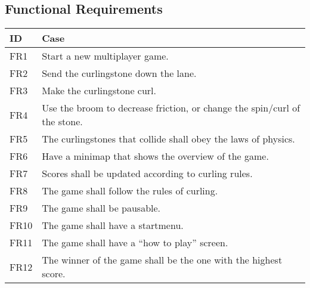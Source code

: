 \subsection{Functional Requirements}

\begin{center}
    \begin{tabular}{ | l | p{12cm} |}
    \hline
	\textbf{ID} & \textbf{Case} \\ \hline
	FR1 & Start a new multiplayer game.\\ \hline 
	FR2 & Send the curlingstone down the lane.\\ \hline 
	FR3 & Make the curlingstone curl. \\ \hline 
	FR4 & Use the broom to decrease friction, or change the spin/curl of the stone.\\ \hline 
	FR5 & The curlingstones that collide shall obey the laws of physics. \\ \hline 
	FR6 & Have a minimap that shows the overview of the game.\\ \hline 
	FR7 & Scores shall be updated according to curling rules.\\ \hline 
	FR8 & The game shall follow the rules of curling.\\ \hline 
	FR9 & The game shall be pausable.\\ \hline 
	FR10 & The game shall have a startmenu.\\ \hline 
	FR11 & The game shall have a “how to play” screen.\\ \hline 
	FR12 & The winner of the game shall be the one with the highest score. \\ \hline

    \hline
    \end{tabular}
\end{center}